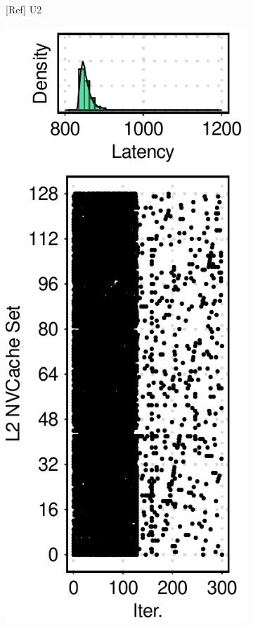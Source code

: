 \begin{figure}[t]
\begin{subfigure}[b]{.12\textwidth}
        \caption{[Ref] U2}
        \label{fig:12:ref:side-channel-feature-u2}
    \end{subfigure}
    \hfill
    \begin{subfigure}[b]{.12\textwidth}
        \centering
        \includegraphics[width=\linewidth]{figure/plot/reference/fig12-side-sql-c1.pdf}

\end{subfigure}
\end{figure}
